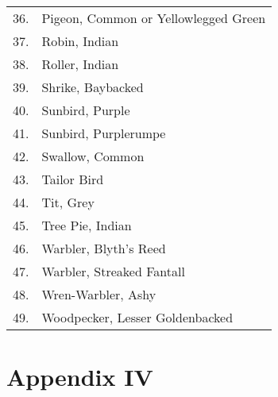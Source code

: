 \begin{longtable}{cl}
36. &Pigeon, Common or Yellowlegged Green \\
37. &Robin, Indian \\
38.& Roller, Indian \\
39.&  Shrike, Baybacked \\
40.& Sunbird, Purple \\
41.& Sunbird, Purplerumpe \\
42.& Swallow, Common \\
43.& Tailor Bird \\
44.& Tit, Grey \\
45.& Tree Pie, Indian \\
46.& Warbler, Blyth's Reed \\
47.& Warbler, Streaked Fantall \\
48.& Wren-Warbler, Ashy \\
49.& Woodpecker, Lesser Goldenbacked 
\end{longtable}

\newpage

\chapter*{Appendix IV}

